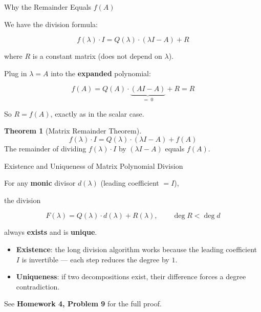 \documentclass[10pt]{beamer}
\theoremstyle{definition}
\newtheorem{thm}{Theorem}[section]
\newcommand{\x}[1]{\alert{\textbf{#1}}}
\begin{document}
\begin{frame}{Why the Remainder Equals $f(A)$}

\vfill

We have the division formula:

$$f(\lambda) \cdot I = Q(\lambda) \cdot (\lambda I - A) + R$$

where $R$ is a constant matrix (does not depend on $\lambda$).

\vfill

Plug in $\lambda = A$ into the \x{expanded} polynomial:

$$f(A) = Q(A) \cdot \underbrace{(AI - A)}_{=\; 0} + R = R$$

\vfill

So $R = f(A)$, exactly as in the scalar case.

\vfill

\begin{thm}[Matrix Remainder Theorem]
$$f(\lambda) \cdot I = Q(\lambda) \cdot (\lambda I - A) + f(A)$$
The remainder of dividing $f(\lambda) \cdot I$ by $(\lambda I - A)$ equals $f(A)$.
\end{thm}

\vfill
\end{frame}


\begin{frame}{Existence and Uniqueness of Matrix Polynomial Division}

\vfill

For any \x{monic} divisor $d(\lambda)$ (leading coefficient $= I$),

the division

$$F(\lambda) = Q(\lambda) \cdot d(\lambda) + R(\lambda), \qquad \deg R < \deg d$$

always \x{exists} and is \x{unique}.

\vfill

\begin{itemize}
\item \x{Existence}: the long division algorithm works because the leading
coefficient $I$ is invertible --- each step reduces the degree by $1$.

\vfill

\item \x{Uniqueness}: if two decompositions exist, their difference forces
a degree contradiction.
\end{itemize}

\vfill

See \x{Homework 4, Problem 9} for the full proof.

\vfill
\end{frame}
\end{document}
